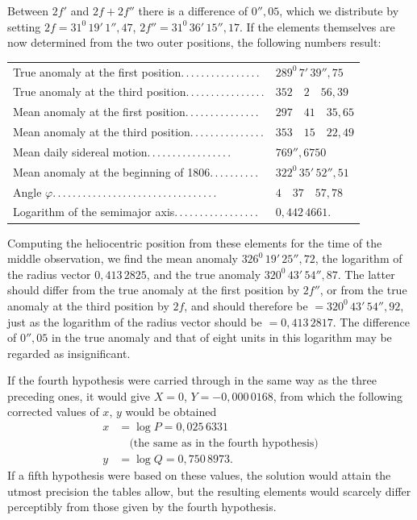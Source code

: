 Between $2f'$ and $2f+2f''$ there is a difference of $0''{,}05$, which we distribute by setting
$2f=31^0\,19'\,1''{,}47$, $2f''=31^0\,36'\,15''{,}17$. If the elements themselves are now determined from the two
outer positions, the following numbers result:
\begin{center}\begingroup\footnotesize\setlength{\tabcolsep}{3pt}\renewcommand{\arraystretch}{1.3}
\begin{tabular}{ll}
True anomaly at the first position\quad .\,.\,.\,.\,.\,.\,.\,.\,.\,.\,.\,.\,.\,.\,.\,. & $289^0\,7'\,39''{,}75$\\
True anomaly at the third position\quad .\,.\,.\,.\,.\,.\,.\,.\,.\,.\,.\,.\,.\,.\,.\,. & $352\quad2\quad56{,}39$\\
Mean anomaly at the first position\quad .\,.\,.\,.\,.\,.\,.\,.\,.\,.\,.\,.\,.\,.\,. & $297\quad41\quad35{,}65$\\
Mean anomaly at the third position\quad .\,.\,.\,.\,.\,.\,.\,.\,.\,.\,.\,.\,.\,.\,. & $353\quad15\quad22{,}49$\\
Mean daily sidereal motion\quad .\,.\,.\,.\,.\,.\,.\,.\,.\,.\,.\,.\,.\,.\,.\,.\,. & $769''{,}6750$\\
Mean anomaly at the beginning of 1806\quad .\,.\,.\,.\,.\,.\,.\,.\,.\,. & $322^0\,35'\,52''{,}51$\\
Angle $\varphi$\quad .\,.\,.\,.\,.\,.\,.\,.\,.\,.\,.\,.\,.\,.\,.\,.\,.\,.\,.\,.\,.\,.\,.\,.\,.\,.\,.\,.\,.\,.\,.\,.\,. & $4\quad37\quad57{,}78$\\
Logarithm of the semimajor axis\quad .\,.\,.\,.\,.\,.\,.\,.\,.\,.\,.\,.\,.\,.\,.\,.\,. & $0{,}442\,4661$.
\end{tabular}
\endgroup\end{center}

Computing the heliocentric position from these elements for the time of the middle observation, we find the mean anomaly $326^0\,19'\,25''{,}72$, the logarithm of the radius
vector $0{,}413\,2825$, and the true anomaly $320^0\,43'\,54''{,}87$. The latter should differ from the  true anomaly at the first position by $2f''$, or from the true anomaly at the
third position by $2f$, and should therefore be $=320^{0}\,43'\,54''{,}92$, just as the
logarithm of the radius vector should be $=0{,}413\,2817$. The difference of $0''{,}05$ in the true anomaly
and that of eight units in this logarithm may be regarded as insignificant.

If the fourth hypothesis were carried through in the same way as the three preceding ones,
it would give $X=0$, $Y=-0{,}000\,0168$, from which the following corrected values of $x$, $y$
would be obtained
\[
\begin{aligned}x &= \log P = 0{,}025\,6331 \\ &\quad\text{(the same as in the fourth hypothesis)}
\\
y &= \log Q = 0{,}750\,8973.
\end{aligned}
\]
\noindent If a fifth hypothesis were based on these values, the solution would attain the utmost
precision the tables allow, but the resulting elements would scarcely differ perceptibly
from those given by the fourth hypothesis.

